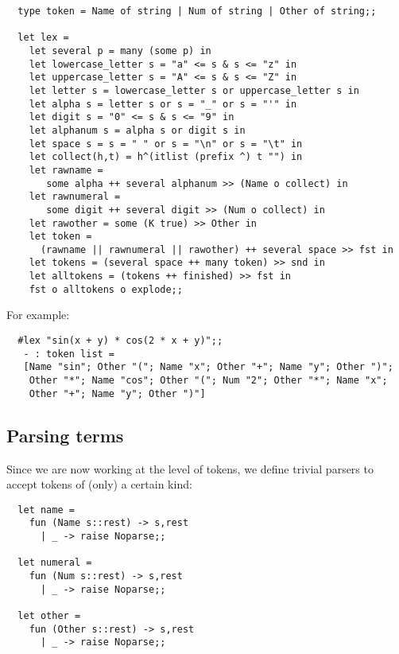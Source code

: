 \begin{boxed}\begin{lstlisting}
  type token = Name of string | Num of string | Other of string;;

  let lex =
    let several p = many (some p) in
    let lowercase_letter s = "a" <= s & s <= "z" in
    let uppercase_letter s = "A" <= s & s <= "Z" in
    let letter s = lowercase_letter s or uppercase_letter s in
    let alpha s = letter s or s = "_" or s = "'" in
    let digit s = "0" <= s & s <= "9" in
    let alphanum s = alpha s or digit s in
    let space s = s = " " or s = "\n" or s = "\t" in
    let collect(h,t) = h^(itlist (prefix ^) t "") in
    let rawname =
       some alpha ++ several alphanum >> (Name o collect) in
    let rawnumeral =
       some digit ++ several digit >> (Num o collect) in
    let rawother = some (K true) >> Other in
    let token =
      (rawname || rawnumeral || rawother) ++ several space >> fst in
    let tokens = (several space ++ many token) >> snd in
    let alltokens = (tokens ++ finished) >> fst in
    fst o alltokens o explode;;
\end{lstlisting}\end{boxed}

\noindent For example:

\begin{boxed}\begin{verbatim}
  #lex "sin(x + y) * cos(2 * x + y)";;
   - : token list =
   [Name "sin"; Other "("; Name "x"; Other "+"; Name "y"; Other ")";
    Other "*"; Name "cos"; Other "("; Num "2"; Other "*"; Name "x";
    Other "+"; Name "y"; Other ")"]
\end{verbatim}\end{boxed}

\subsection{Parsing terms}

Since we are now working at the level of tokens, we define trivial parsers to
accept tokens of (only) a certain kind:

\begin{boxed}\begin{lstlisting}
  let name =
    fun (Name s::rest) -> s,rest
      | _ -> raise Noparse;;

  let numeral =
    fun (Num s::rest) -> s,rest
      | _ -> raise Noparse;;

  let other =
    fun (Other s::rest) -> s,rest
      | _ -> raise Noparse;;
\end{lstlisting}\end{boxed}

